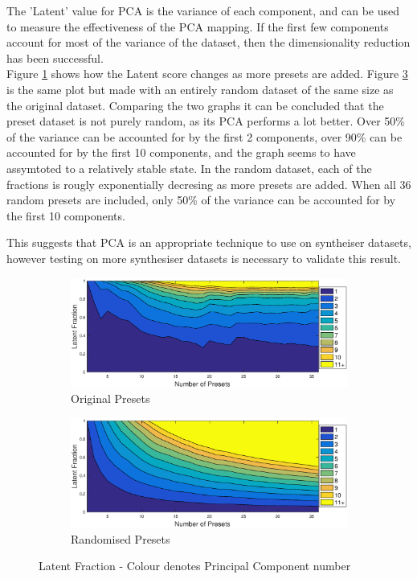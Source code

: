 \documentclass[11pt, oneside]{report}   	%
\begin{document}
The 'Latent' value for PCA is the variance of each component, and can be used to measure the effectiveness of the PCA mapping. If the first few components account for most of the variance of the dataset, then the dimensionality reduction has been successful.\\
Figure \ref{fig:LatentOriginal} shows how the Latent score changes as more presets are added. Figure \ref{fig:LatentRandom} is the same plot but made with an entirely random dataset of the same size as the original dataset. Comparing the two graphs it can be concluded that the preset dataset is not purely random, as its PCA performs a lot better. Over 50\% of the variance can be accounted for by the first 2 components,  over 90\% can be accounted for by the first 10 components, and the graph seems to have assymtoted to a relatively stable state. In the random dataset, each of the fractions is rougly exponentially decresing as more presets are added. When all 36 random presets are included, only 50\% of the variance can be accounted for by the first 10 components. 

This suggests that PCA is an appropriate technique to use on syntheiser datasets, however testing on more synthesiser datasets is necessary to validate this result.
\begin{figure}
	\hspace{-40pt}
	\begin{subfigure}{3.5in}
		\includegraphics[width = \textwidth]{LatentFraction.eps}
		\caption{Original Presets}
		\label{fig:LatentOriginal}
	\end{subfigure} 
%
	\begin{subfigure}{3.5in}
		\includegraphics[width = \textwidth]{LatentFractionRandom.eps}
		\caption{Randomised Presets}
		\label{fig:LatentRandom}
	\end{subfigure}
	\caption{Latent Fraction - Colour denotes Principal Component number}
\end{figure}
\end{document}
